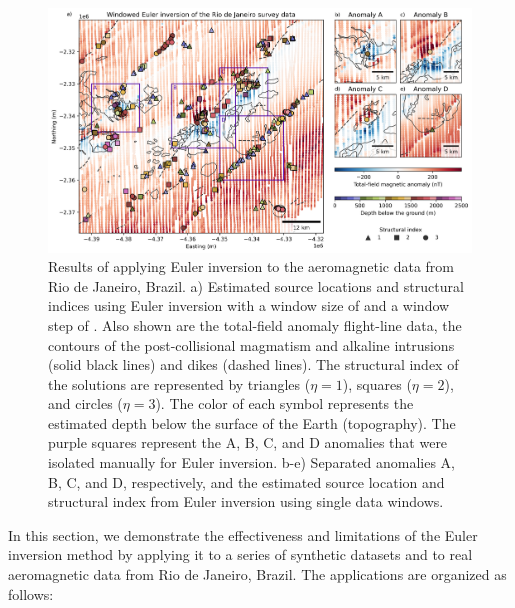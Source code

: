 \begin{figure}[tb!]
\centering
\includegraphics[width=1\linewidth]{figures/real-data-application.png}
\caption{
    Results of applying Euler inversion to the aeromagnetic data from Rio de Janeiro, Brazil. 
    a) Estimated source locations and structural indices using Euler inversion with a window size of \RioWindowSize{} and a window step of \RioWindowStep{}. 
    Also shown are the total-field anomaly flight-line data, the contours of the post-collisional magmatism and alkaline intrusions (solid black lines) and dikes (dashed lines).
    The structural index of the solutions are represented by triangles ($\eta=1$),  squares ($\eta=2$), and circles ($\eta=3$). 
    The color of each symbol represents the estimated depth below the surface of the Earth (topography).
    The purple squares represent the A, B, C, and D anomalies that were isolated manually for Euler inversion.
    b-e) Separated anomalies A, B, C, and D, respectively, and the estimated source location and structural index from Euler inversion using single data windows.
}
\label{fig:real}
\end{figure}

In this section, we demonstrate the effectiveness and limitations of the Euler
inversion method by applying it to a series of synthetic datasets and to real
aeromagnetic data from Rio de Janeiro, Brazil.
The applications are organized as follows:

